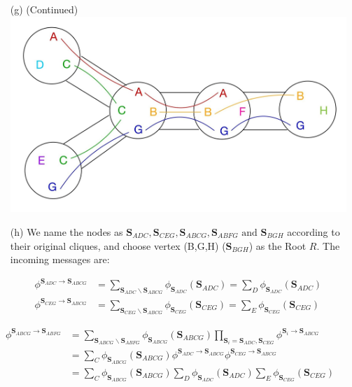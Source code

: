 \documentclass[11pt]{article}
\renewcommand{\vec}[1]{\mathbf{#1}}
\begin{document}
\begin{answertext}{23cm}{}

\begin{itemize}
\item[(g)] (Continued)\\
\includegraphics[scale=0.23]{tree}
\item[(h)] We name the nodes as $\vec{S}_{ADC},\vec{S}_{CEG},\vec{S}_{ABCG},\vec{S}_{ABFG}\text{ and }\vec{S}_{BGH}$ according to their original cliques, and choose vertex (B,G,H) ($\vec{S}_{BGH}$) as the Root $R$. The incoming messages are:

\begin{align*}
\phi^{\vec{S}_{ADC}\to\vec{S}_{ABCG}}&=\sum_{\vec{S}_{ADC}\backslash \vec{S}_{ABCG}}\phi_{\vec{S}_{ADC}}(\vec{S}_{ADC}) = \sum_{D}\phi_{\vec{S}_{ADC}}(\vec{S}_{ADC})\\
\phi^{\vec{S}_{CEG}\to\vec{S}_{ABCG}}&=\sum_{\vec{S}_{CEG}\backslash \vec{S}_{ABCG}}\phi_{\vec{S}_{CEG}}(\vec{S}_{CEG}) = \sum_{E}\phi_{\vec{S}_{CEG}}(\vec{S}_{CEG})
\end{align*}
\end{itemize}
\begin{align*}
\phi^{\vec{S}_{ABCG}\to\vec{S}_{ABFG}}&=\sum_{\vec{S}_{ABCG}\backslash \vec{S}_{ABFG}}\phi_{\vec{S}_{ABCG}}(\vec{S}_{ABCG})\prod_{\vec{S}_i=\vec{S}_{ADC},\vec{S}_{CEG}}\phi^{\vec{S}_i\to\vec{S}_{ABCG}}\\
&= \sum_{C}\phi_{\vec{S}_{ABCG}}(\vec{S}_{ABCG})\phi^{\vec{S}_{ADC}\to\vec{S}_{ABCG}}\phi^{\vec{S}_{CEG}\to\vec{S}_{ABCG}}\\
&= \sum_{C}\phi_{\vec{S}_{ABCG}}(\vec{S}_{ABCG})\sum_{D}\phi_{\vec{S}_{ADC}}(\vec{S}_{ADC})\sum_{E}\phi_{\vec{S}_{CEG}}(\vec{S}_{CEG})
\end{align*}

\end{answertext}
\pagebreak
\end{document}
